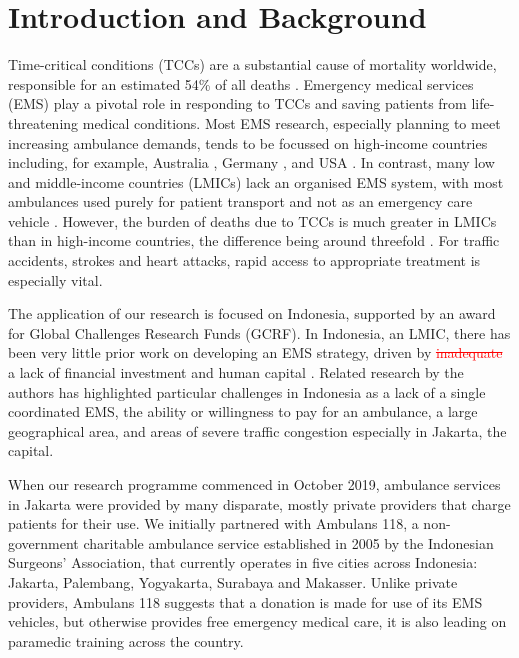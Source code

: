 \documentclass[numbers,webpdf,imaman]{ima-authoring-template}%
\begin{document}


\maketitle


\section{Introduction and Background}\label{sec:intro}
Time-critical conditions (TCCs) are a substantial cause of mortality
worldwide, responsible for an estimated 54\% of all deaths \citep{FraserBMJ}.
Emergency medical services (EMS) play a pivotal role in responding to TCCs and
saving patients from life-threatening medical conditions. Most EMS research,
especially  planning to meet increasing ambulance demands, tends to be
focussed on high-income countries including, for example, Australia
\citep{lowthian2011increasing}, Germany \citep{veser2015demographic}, and USA
\citep{birmingham2021trends}. In contrast, many low and middle-income countries
(LMICs) lack an organised EMS system, with most ambulances used purely for
patient transport and not as an emergency care vehicle \citep{plummer2017ems}.
However, the burden of deaths due to TCCs is much greater in LMICs than in
high-income countries, the difference being around threefold \citep{ChangPMC}.
For traffic accidents, strokes and heart attacks, rapid access to appropriate
treatment is especially vital. 

The application of our research is focused on Indonesia, supported by an
award for Global Challenges Research Funds (GCRF). In Indonesia, an LMIC,
there has been very little prior work on developing an EMS strategy, driven
by \textcolor{red}{\st{inadequate}} a lack of financial investment and human capital
\citep{plummer2017ems,pusponegoro2003terrorism,yusvirazi2018state}.
Related research by the authors \citep{BriceSyaribahNoor2022Esui} has
highlighted particular challenges in Indonesia as a lack of a single
coordinated EMS, the ability or willingness to pay for an ambulance, a large
geographical area, and areas of severe traffic congestion especially in
Jakarta, the capital.  

When our research programme commenced in October 2019, ambulance services in
Jakarta were provided by many disparate, mostly private providers that charge
patients for their use. We initially partnered with Ambulans 118, a
non-government charitable ambulance service established in 2005 by the
Indonesian Surgeons’ Association, that  currently operates in five cities across
Indonesia: Jakarta, Palembang, Yogyakarta, Surabaya and Makasser. Unlike private
providers, Ambulans 118 suggests that a donation is made for use of its EMS
vehicles, but otherwise provides free emergency medical care, it is also leading
on paramedic training across the country. 
\end{document}
